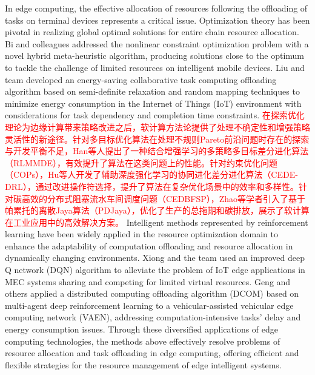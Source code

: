 \documentclass[preprint,12pt]{elsarticle}
\begin{document}
In edge computing, the effective allocation of resources following the offloading of tasks on terminal devices represents a critical issue. Optimization theory has been pivotal in realizing global optimal solutions for entire chain resource allocation. Bi and colleagues addressed the nonlinear constraint optimization problem with a novel hybrid meta-heuristic algorithm, producing solutions close to the optimum to tackle the challenge of limited resources on intelligent mobile devices\cite{bi2020energy}. Liu and team developed an energy-saving collaborative task computing offloading algorithm based on semi-definite relaxation and random mapping techniques to minimize energy consumption in the Internet of Things (IoT) environment with considerations for task dependency and completion time constraints\cite{liu2019energy}. 
\textcolor{red}{在探索优化理论为边缘计算带来策略改进之后，软计算方法论提供了处理不确定性和增强策略灵活性的新途径。针对多目标优化算法在处理不规则Pareto前沿问题时存在的探索与开发平衡不足，Han等人提出了一种结合增强学习的多策略多目标差分进化算法（RLMMDE），有效提升了算法在这类问题上的性能。针对约束优化问题（COPs），Hu等人开发了辅助深度强化学习的协同进化差分进化算法（CEDE-DRL），通过改进操作符选择，提升了算法在复杂优化场景中的效率和多样性。针对碳高效的分布式阻塞流水车间调度问题（CEDBFSP），Zhao等学者引入了基于帕累托的离散Jaya算法（PDJaya），优化了生产的总拖期和碳排放，展示了软计算在工业应用中的高效解决方案。}
Intelligent methods represented by reinforcement learning have been widely applied in the resource optimization domain to enhance the adaptability of computation offloading and resource allocation in dynamically changing environments. Xiong and the team used an improved deep Q network (DQN) algorithm to alleviate the problem of IoT edge applications in MEC systems sharing and competing for limited virtual resources\cite{xiong2020resource}. Geng and others applied a distributed computing offloading algorithm (DCOM) based on multi-agent deep reinforcement learning to a vehicular-assisted vehicular edge computing network (VAEN), addressing computation-intensive tasks' delay and energy consumption issues\cite{geng2023deep}. Through these diversified applications of edge computing technologies, the methods above effectively resolve problems of resource allocation and task offloading in edge computing, offering efficient and flexible strategies for the resource management of edge intelligent systems.
\end{document}
